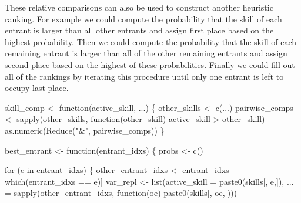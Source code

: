 \documentclass[
  letterpaper,
  DIV=11,
  numbers=noendperiod]{scrartcl}
\newenvironment{Shaded}{\begin{snugshade}}{\end{snugshade}}
\newcommand{\ControlFlowTok}[1]{\textcolor[rgb]{0.00,0.23,0.31}{#1}}
\newcommand{\FunctionTok}[1]{\textcolor[rgb]{0.28,0.35,0.67}{#1}}
\newcommand{\NormalTok}[1]{\textcolor[rgb]{0.00,0.23,0.31}{#1}}
\newcommand{\OtherTok}[1]{\textcolor[rgb]{0.00,0.23,0.31}{#1}}
\newcommand{\SpecialCharTok}[1]{\textcolor[rgb]{0.37,0.37,0.37}{#1}}
\newcommand{\StringTok}[1]{\textcolor[rgb]{0.13,0.47,0.30}{#1}}
\begin{document}
These relative comparisons can also be used to construct another
heuristic ranking. For example we could compute the probability that the
skill of each entrant is larger than all other entrants and assign first
place based on the highest probability. Then we could compute the
probability that the skill of each remaining entrant is larger than all
of the other remaining entrants and assign second place based on the
highest of these probabilities. Finally we could fill out all of the
rankings by iterating this procedure until only one entrant is left to
occupy last place.

\begin{Shaded}
\begin{Highlighting}[]
\NormalTok{skill\_comp }\OtherTok{\textless{}{-}} \ControlFlowTok{function}\NormalTok{(active\_skill, ...) \{}
\NormalTok{  other\_skills }\OtherTok{\textless{}{-}} \FunctionTok{c}\NormalTok{(...)}
\NormalTok{  pairwise\_comps }\OtherTok{\textless{}{-}} \FunctionTok{sapply}\NormalTok{(other\_skills,}
                           \ControlFlowTok{function}\NormalTok{(other\_skill)}
\NormalTok{                           active\_skill }\SpecialCharTok{\textgreater{}}\NormalTok{ other\_skill)}
  \FunctionTok{as.numeric}\NormalTok{(}\FunctionTok{Reduce}\NormalTok{(}\StringTok{"\&"}\NormalTok{, pairwise\_comps))}
\NormalTok{\}}

\NormalTok{best\_entrant }\OtherTok{\textless{}{-}} \ControlFlowTok{function}\NormalTok{(entrant\_idxs) \{}
\NormalTok{  probs }\OtherTok{\textless{}{-}} \FunctionTok{c}\NormalTok{()}

  \ControlFlowTok{for}\NormalTok{ (e }\ControlFlowTok{in}\NormalTok{ entrant\_idxs) \{}
\NormalTok{    other\_entrant\_idxs }\OtherTok{\textless{}{-}}\NormalTok{ entrant\_idxs[}\SpecialCharTok{{-}}\FunctionTok{which}\NormalTok{(entrant\_idxs }\SpecialCharTok{==}\NormalTok{ e)]}
\NormalTok{    var\_repl }\OtherTok{\textless{}{-}} \FunctionTok{list}\NormalTok{(}\StringTok{\textquotesingle{}active\_skill\textquotesingle{}} \OtherTok{=} \FunctionTok{paste0}\NormalTok{(}\StringTok{\textquotesingle{}skills[\textquotesingle{}}\NormalTok{, e,}\StringTok{\textquotesingle{}]\textquotesingle{}}\NormalTok{),}
                     \StringTok{\textquotesingle{}...\textquotesingle{}} \OtherTok{=} \FunctionTok{sapply}\NormalTok{(other\_entrant\_idxs,}
                                    \ControlFlowTok{function}\NormalTok{(oe)}
                                    \FunctionTok{paste0}\NormalTok{(}\StringTok{\textquotesingle{}skills[\textquotesingle{}}\NormalTok{, oe,}\StringTok{\textquotesingle{}]\textquotesingle{}}\NormalTok{)))}


\end{Highlighting}
\end{Shaded}
\end{document}
